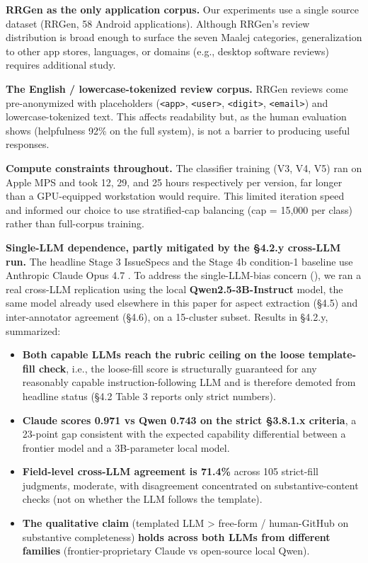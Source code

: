 \documentclass[sigconf, nonacm, anonymous, balance=false]{acmart}
\providecommand{\tightlist}{\setlength{\itemsep}{0pt}\setlength{\parskip}{0pt}}
\begin{document}
\textbf{RRGen as the only application corpus.} Our experiments use a single source dataset (RRGen, 58 Android applications). Although RRGen's review distribution is broad enough to surface the seven Maalej categories, generalization to other app stores, languages, or domains (e.g., desktop software reviews) requires additional study.

\textbf{The English / lowercase-tokenized review corpus.} RRGen reviews come pre-anonymized with placeholders (\texttt{\textless{}app\textgreater{}}, \texttt{\textless{}user\textgreater{}}, \texttt{\textless{}digit\textgreater{}}, \texttt{\textless{}email\textgreater{}}) and lowercase-tokenized text. This affects readability but, as the human evaluation shows (helpfulness 92\% on the full system), is not a barrier to producing useful responses.

\textbf{Compute constraints throughout.} The classifier training (V3, V4, V5) ran on Apple MPS and took 12, 29, and 25 hours respectively per version, far longer than a GPU-equipped workstation would require. This limited iteration speed and informed our choice to use stratified-cap balancing (cap = 15,000 per class) rather than full-corpus training.

\textbf{Single-LLM dependence, partly mitigated by the \S4.2.y cross-LLM run.} The headline Stage 3 IssueSpecs and the Stage 4b condition-1 baseline use Anthropic Claude Opus 4.7 \cite{anthropic2025claude}. To address the single-LLM-bias concern (), we ran a real cross-LLM replication using the local \textbf{Qwen2.5-3B-Instruct} model, the same model already used elsewhere in this paper for aspect extraction (\S4.5) and inter-annotator agreement (\S4.6), on a 15-cluster subset. Results in \S4.2.y, summarized:

\begin{itemize}
\tightlist
\item
  \textbf{Both capable LLMs reach the rubric ceiling on the loose template-fill check}, i.e., the loose-fill score is structurally guaranteed for any reasonably capable instruction-following LLM and is therefore demoted from headline status (\S4.2 Table 3 reports only strict numbers).
\item
  \textbf{Claude scores 0.971 vs Qwen 0.743 on the strict \S3.8.1.x criteria}, a 23-point gap consistent with the expected capability differential between a frontier model and a 3B-parameter local model.
\item
  \textbf{Field-level cross-LLM agreement is 71.4\%} across 105 strict-fill judgments, moderate, with disagreement concentrated on substantive-content checks (not on whether the LLM follows the template).
\item
  \textbf{The qualitative claim} (templated LLM \textgreater{} free-form / human-GitHub on substantive completeness) \textbf{holds across both LLMs from different families} (frontier-proprietary Claude vs open-source local Qwen).
\end{itemize}
\end{document}
